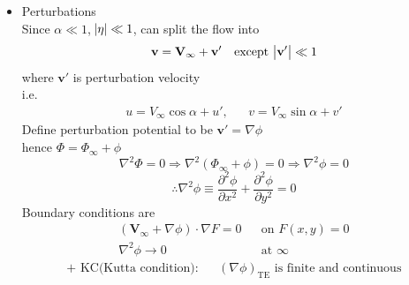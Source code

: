 \begin{itemize}
\item Perturbations\\
Since $\alpha\ll 1$, $\abs{\eta}\ll 1$, can split the flow into
\begin{align*}
\mathbf{v}=\mathbf{V}_\infty + \mathbf{v'} &&\text{except }\abs{\mathbf{v'}}\ll 1
\end{align*}
where $\mathbf{v'}$ is perturbation velocity\\
i.e.
\begin{align*}
u = V_\infty\cos\alpha + u', &&v = V_\infty\sin\alpha + v'
\end{align*}
Define perturbation potential to be $\mathbf{v'}=\nabla\phi$\\
hence $\Phi = \Phi_\infty + \phi$
\[
\nabla^2\Phi = 0\Longrightarrow\nabla^2\left(\Phi_\infty+\phi\right) = 0\Longrightarrow\nabla^2\phi = 0
\]
\begin{equation}
\therefore\nabla^2\phi \equiv\frac{\partial^2\phi}{\partial x^2} + \frac{\partial^2\phi}{\partial y^2} = 0
\label{eq: 6-1-4}
\end{equation}
Boundary conditions are
\begin{subequations}
\begin{align}
\left(\mathbf{V_\infty} + \nabla\phi\right)\cdot\nabla F = 0 && \text{on $F(x,y)=0$} \label{eq: 6-1-5a}\\
\nabla^2\phi\to 0 && \text{at $\infty$}\label{eq: 6-1-5b}
\end{align}
\end{subequations}
\begin{align}
\text{+ KC(Kutta condition)}\colon&&\left(\nabla\phi\right)_{\text{TE}}\text{ is finite and continuous}\label{eq: 6-1-6}
\end{align}
\end{itemize}
